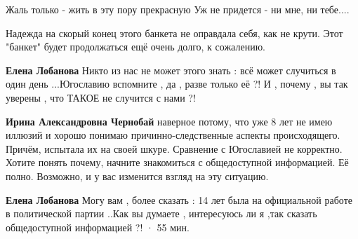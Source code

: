 \begin{itemize}
 
Жаль только - жить в эту пору прекрасную
Уж не придется - ни мне, ни тебе....

 
Надежда на скорый конец этого банкета не оправдала себя, как не крути. Этот "банкет" будет продолжаться ещё очень долго, к сожалению.

\begin{itemize}
 
\textbf{Елена Лобанова} Никто из нас не может этого знать : всё может случиться
в один день ...Югославию вспомните , да , разве только её ?! И , почему , вы
так уверены , что ТАКОЕ не случится с нами ?!

 
\textbf{Ирина Александровна Чернобай} наверное потому, что уже 8 лет не имею
иллюзий и хорошо понимаю причинно-следственные аспекты происходящего. Причём,
испытала их на своей шкуре. Сравнение с Югославией не корректно. Хотите понять
почему, начните знакомиться с общедоступной информацией. Её полно. Возможно, и
у вас изменится взгляд на эту ситуацию.

 
\textbf{Елена Лобанова} Могу вам , более сказать : 14 лет была на официальной
работе в политической партии ..Как вы думаете , интересуюсь ли я ,так сказать
общедоступной информацией ?!
 · 55 мин.
 

\end{itemize}
\end{itemize}
